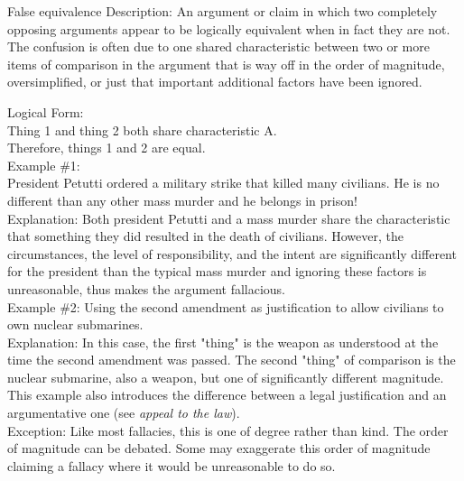 \documentclass[a4paper,12pt,single,pdftex]{scrartcl}
\begin{document}
False equivalence
    Description: An argument or claim in which two completely opposing arguments appear to be logically equivalent when in fact they are not. The confusion is often due to one shared characteristic between two or more items of comparison in the argument that is way off in the order of magnitude, oversimplified, or just that important additional factors have been ignored.

    
      Logical Form:
    \\

    
      Thing 1 and thing 2 both share characteristic A.
    \\

    
      Therefore, things 1 and 2 are equal.
    \\

    
      Example \#1:
    \\

    
      President Petutti ordered a military strike that killed many civilians. He is no different than any other mass murder and he belongs in prison!
    \\

    
      Explanation: Both president Petutti and a mass murder share the characteristic that something they did resulted in the death of civilians. However, the circumstances, the level of responsibility, and the intent are significantly different for the president than the typical mass murder and ignoring these factors is unreasonable, thus makes the argument fallacious.
    \\

    
      Example \#2: Using the second amendment as justification to allow civilians to own nuclear submarines.
    \\

    
      Explanation: In this case, the first "thing" is the weapon as understood at the time the second amendment was passed. The second "thing" of comparison is the nuclear submarine, also a weapon, but one of significantly different magnitude. This example also introduces the difference between a legal justification and an argumentative one (see {\it appeal to the law}).
    \\

    
      Exception: Like most fallacies, this is one of degree rather than kind. The order of magnitude can be debated. Some may exaggerate this order of magnitude claiming a fallacy where it would be unreasonable to do so.
    \\
\end{document}
